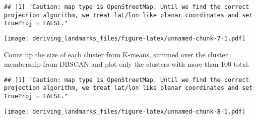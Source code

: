 \documentclass[]{article}
\newenvironment{Shaded}{\begin{snugshade}}{\end{snugshade}}
\newcommand{\DataTypeTok}[1]{\textcolor[rgb]{0.13,0.29,0.53}{#1}}
\newcommand{\DecValTok}[1]{\textcolor[rgb]{0.00,0.00,0.81}{#1}}
\newcommand{\ErrorTok}[1]{\textcolor[rgb]{0.64,0.00,0.00}{\textbf{#1}}}
\newcommand{\FloatTok}[1]{\textcolor[rgb]{0.00,0.00,0.81}{#1}}
\newcommand{\KeywordTok}[1]{\textcolor[rgb]{0.13,0.29,0.53}{\textbf{#1}}}
\newcommand{\NormalTok}[1]{#1}
\newcommand{\OperatorTok}[1]{\textcolor[rgb]{0.81,0.36,0.00}{\textbf{#1}}}
\newcommand{\StringTok}[1]{\textcolor[rgb]{0.31,0.60,0.02}{#1}}
\begin{document}
\begin{Shaded}
\end{Shaded}

\begin{verbatim}
## [1] "Caution: map type is OpenStreetMap. Until we find the correct projection algorithm, we treat lat/lon like planar coordinates and set TrueProj = FALSE."
\end{verbatim}

\texttt{[image: deriving\_landmarks\_files/figure-latex/unnamed-chunk-7-1.pdf]}

Count up the size of each cluster from K-means, summed over the cluster
membership from DBSCAN and plot only the clusters with more than 100
total.

\begin{verbatim}
## [1] "Caution: map type is OpenStreetMap. Until we find the correct projection algorithm, we treat lat/lon like planar coordinates and set TrueProj = FALSE."
\end{verbatim}

\texttt{[image: deriving\_landmarks\_files/figure-latex/unnamed-chunk-8-1.pdf]}
\end{document}
